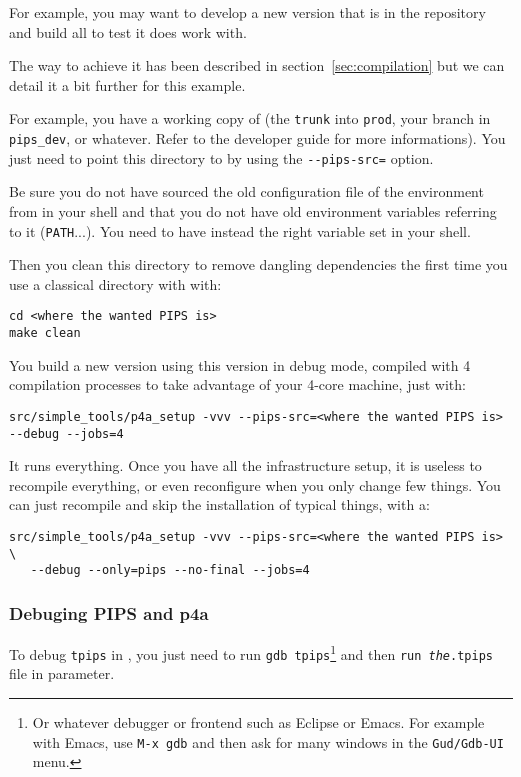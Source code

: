 \documentclass[a4paper]{article}
\begin{document}
For example, you may want to develop a new \Apips version that is in the
\Acri{} \Asvn repository and build all \Apfa to test it does work with.

The way to achieve it has been described in section~\ref{sec:compilation}
but we can detail it a bit further for this example.

For example, you have a \Asvn working copy of \Apips (the \texttt{trunk}
into \texttt{prod}, your branch in \verb|pips_dev|, or whatever. Refer
to the \Apips developer guide for more informations). You just need to
point this directory to \Apfa by using the \verb|--pips-src=| option.

Be sure you do not have sourced the old configuration file of the \Apips
\Asvn environment from \Acri in your shell and that you do not have old
environment variables referring to it (\verb|PATH|...). You need to have
instead the right \Apfa variable set in your shell.

Then you clean this directory to remove dangling dependencies the first
time you use a classical \Apips directory with \Apfa with:
\begin{verbatim}
cd <where the wanted PIPS is>
make clean
\end{verbatim}

You build a new \Apfa version using this \Apips version in debug mode,
compiled with 4 compilation processes to take advantage of your 4-core
machine, just with:
\begin{verbatim}
src/simple_tools/p4a_setup -vvv --pips-src=<where the wanted PIPS is> --debug --jobs=4
\end{verbatim}

It runs everything. Once you have all the infrastructure setup, it is
useless to recompile everything, or even reconfigure \Apips when you only
change few things. You can just recompile \Apips and skip the installation
of typical \Apfa things, with a:
\begin{verbatim}
src/simple_tools/p4a_setup -vvv --pips-src=<where the wanted PIPS is> \
   --debug --only=pips --no-final --jobs=4
\end{verbatim}


\subsubsection{Debuging PIPS and p4a}
\label{sec:debuging-pips-p4a}

To debug \texttt{tpips} in \Apfa, you just need to run \texttt{gdb
  tpips}\footnote{Or whatever debugger or frontend such as Eclipse or
  Emacs. For example with Emacs, use \texttt{M-x gdb} and then ask for
  many windows in the \texttt{Gud/Gdb-UI} menu.} and then \texttt{run
  \emph{the}.tpips} file in parameter.
\end{document}
